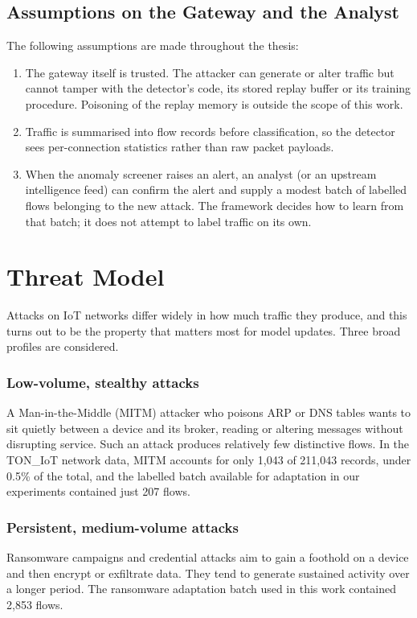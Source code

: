 \subsection{Assumptions on the Gateway and the Analyst}
\label{subsec:assumptions}

The following assumptions are made throughout the thesis:
\begin{enumerate}
    \item The gateway itself is trusted. The attacker can generate or alter traffic but cannot tamper with the detector's code, its stored replay buffer or its training procedure. Poisoning of the replay memory is outside the scope of this work.
    \item Traffic is summarised into flow records before classification, so the detector sees per-connection statistics rather than raw packet payloads.
    \item When the anomaly screener raises an alert, an analyst (or an upstream intelligence feed) can confirm the alert and supply a modest batch of labelled flows belonging to the new attack. The framework decides how to learn from that batch; it does not attempt to label traffic on its own.
\end{enumerate}

\section{Threat Model}
\label{sec:threat_model}

Attacks on IoT networks differ widely in how much traffic they produce, and this turns out to be the property that matters most for model updates. Three broad profiles are considered.

\subsubsection{Low-volume, stealthy attacks}
A Man-in-the-Middle (MITM) attacker who poisons ARP or DNS tables wants to sit quietly between a device and its broker, reading or altering messages without disrupting service. Such an attack produces relatively few distinctive flows. In the TON\_IoT network data, MITM accounts for only 1{,}043 of 211{,}043 records, under 0.5\% of the total, and the labelled batch available for adaptation in our experiments contained just 207 flows.

\subsubsection{Persistent, medium-volume attacks}
Ransomware campaigns and credential attacks aim to gain a foothold on a device and then encrypt or exfiltrate data. They tend to generate sustained activity over a longer period. The ransomware adaptation batch used in this work contained 2{,}853 flows.

